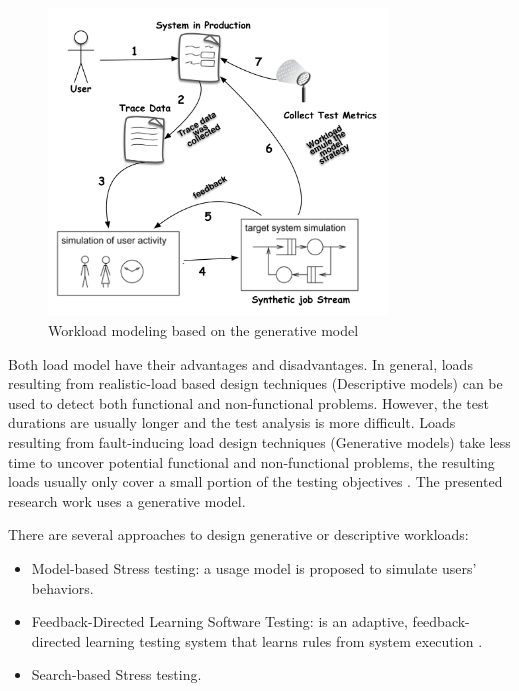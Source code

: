 \begin{figure}[!ht]
\centering
\includegraphics[width=0.8\textwidth]{./images/workloadmodel2300dpi.png}
\caption{Workload modeling based on the generative model \cite{DiLucca2006}}
\label{fig:generativemodel}

\end{figure}

Both load model have their advantages and disadvantages. In general, loads resulting from realistic-load based design techniques (Descriptive models) can be used to detect both functional and non-functional problems. However, the test durations are usually longer and the test analysis is more difficult. Loads resulting from fault-inducing load design techniques (Generative models) take less time to uncover potential functional and non-functional problems, the resulting loads usually only cover a small portion of the testing objectives \cite{Jiang2010}. The presented research work uses a generative model.


There are  several approaches to design generative or descriptive workloads:

\begin{itemize}
\item Model-based Stress testing: a usage model is proposed to simulate users’ behaviors.
\item Feedback-Directed Learning Software Testing: is an adaptive, feedback-directed learning testing system that learns rules from system execution \cite{Luo2015} \cite{Wert2014}.
\item Search-based Stress testing. 
\end{itemize}


